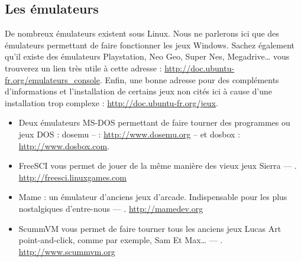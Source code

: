 \subsection{Les émulateurs}
De nombreux émulateurs existent sous Linux. Nous ne parlerons ici que des émulateurs permettant de faire fonctionner les jeux Windows. Sachez également qu'il existe des émulateurs Playstation, Neo Geo, Super Nes, Megadrive\ldots{} vous trouverez un lien très utile à cette adresse : \url{http://doc.ubuntu-fr.org/emulateurs_console}. Enfin, une bonne adresse pour des compléments d'informations et l'installation de certains jeux non cités ici à cause d'une installation trop complexe : \url{http://doc.ubuntu-fr.org/jeux}.
\begin{itemize}
\item Deux émulateurs MS-DOS permettant de faire tourner des programmes ou jeux DOS : dosemu --  : \url{http://www.dosemu.org} -- et dosbox  : \url{http://www.dosbox.com}.
\item FreeSCI vous permet de jouer de la même manière des vieux jeux Sierra --- . \url{http://freesci.linuxgames.com}
\item Mame : un émulateur d'anciens jeux d'arcade. Indispensable pour les plus nostalgiques d'entre-nous --- . \url{http://mamedev.org}
\item ScummVM vous permet de faire tourner tous les anciens jeux Lucas Art point-and-click, comme par exemple, Sam Et Max\ldots{}  --- . \url{http://www.scummvm.org}
\end{itemize}
